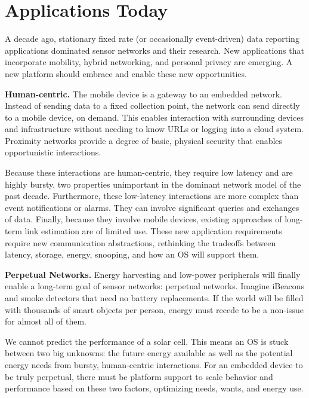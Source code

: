 \section{Applications Today}

A decade ago, stationary fixed rate (or occasionally event-driven) data 
reporting applications dominated sensor networks and their research. 
New applications that incorporate mobility, hybrid networking, and 
personal privacy are emerging. A new platform should embrace and enable 
these new opportunities.

\smallskip\noindent
\textbf{Human-centric.}
The mobile device is a gateway to an embedded network. Instead of
sending data to a fixed collection point, the network can send directly
to a mobile device, on demand. This enables interaction with
surrounding devices and infrastructure without needing to know
URLs or logging into a cloud system. Proximity networks provide a degree
of basic, physical security that enables opportunistic interactions.

Because these interactions are human-centric, they require low latency
and are highly bursty, two properties unimportant in the dominant
network model of the past decade. Furthermore, these low-latency
interactions are more complex than event notifications or alarms. They
can involve significant queries and exchanges of data. Finally,
because they involve mobile devices, existing approaches of long-term
link estimation are of limited use.  These new application
requirements require new communication abstractions, rethinking the
tradeoffs between latency, storage, energy, snooping, and how an OS
will support them.

\smallskip\noindent
\textbf{Perpetual Networks.}
Energy harvesting and low-power peripherals will finally enable a
long-term goal of sensor networks: perpetual networks. Imagine
iBeacons and smoke detectors that need no battery replacements. If the world
will be filled with thousands of smart objects per person, energy must recede
to be a non-issue for almost all of them.

We cannot predict the performance of a solar cell. This means an OS
is stuck between two big unknowns: the future energy available as well as
the potential energy needs from bursty, human-centric interactions. For
an embedded device to be truly perpetual, there must be platform support to
scale behavior and performance based on these two factors, optimizing needs,
wants, and energy use.

